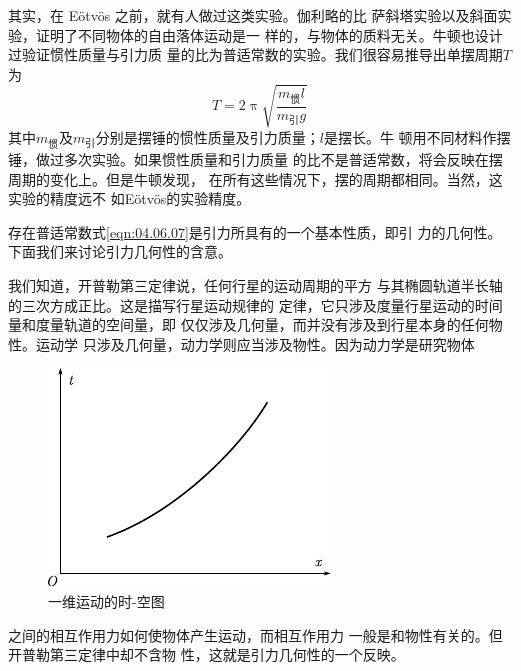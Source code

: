 其实，在 E\"otv\"os 之前，就有人做过这类实验。伽利略的比
萨斜塔实验以及斜面实验，证明了不同物体的自由落体运动是一
样的，与物体的质料无关。牛顿也设计过验证惯性质量与引力质
量的比为普适常数的实验。我们很容易推导出单摆周期$ T $为
\begin{equation*}
	T = 2 \uppi \sqrt{\frac { m _ {\text{惯}} l } { m _ {\text{引}} g }}
\end{equation*}
其中$ m _ {\text{惯}} $及$ m _ {\text{引}} $分别是摆锤的惯性质量及引力质量；$ l $是摆长。牛
顿用不同材料作摆锤，做过多次实验。如果惯性质量和引力质量
的比不是普适常数，将会反映在摆周期的变化上。但是牛顿发现，
在所有这些情况下，摆的周期都相同。当然，这实验的精度远不
如E\"otv\"os的实验精度。

存在普适常数式\eqref{eqn:04.06.07}是引力所具有的一个基本性质，即引
力的几何性。下面我们来讨论引力几何性的含意。

我们知道，开普勒第三定律说，任何行星的运动周期的平方
与其椭圆轨道半长轴的三次方成正比。这是描写行星运动规律的
定律，它只涉及度量行星运动的时间量和度量轨道的空间量，即
仅仅涉及几何量，而并没有涉及到行星本身的任何物性。运动学
只涉及几何量，动力学则应当涉及物性。因为动力学是研究物体
\begin{figure}
	\centering
	\includegraphics{figure/fig04.06}
	\caption{一维运动的时-空图}
	\label{fig:04.06}
\end{figure}
之间的相互作用力如何使物体产生运动，而相互作用力
一般是和物性有关的。但开普勒第三定律中却不含物
性，这就是引力几何性的一个反映。

